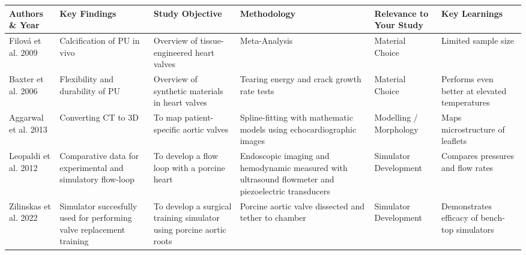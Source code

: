 \renewcommand{\arraystretch}{1.2}
\begin{tabular}{p{50pt}|p{75pt}|p{75pt}|p{110pt}|p{55pt}|p{75pt}}
  \textbf{Authors \& Year} & \textbf{Key Findings}                                                & \textbf{Study Objective}                                            & \textbf{Methodology}                                                                                & \textbf{Relevance to Your Study} & \textbf{Key Learnings}                        \\ \hline
  Filová et al. 2009       & Calcification of PU in vivo                                          & Overview of tissue-engineered heart valves                          & Meta-Analysis                                                                                       & Material Choice                  & Limited sample size                           \\
  Baxter et al. 2006       & Flexibility and durability of PU                                     & Overview of synthetic materials in heart valves                     & Tearing energy and crack growth rate tests                                                          & Material Choice                  & Performs even better at elevated temperatures \\
  Aggarwal et al. 2013     & Converting CT to 3D                                                  & To map patient-specific aortic valves                               & Spline-fitting with mathematic models using echocardiographic images                                & Modelling / Morphology           & Maps microstructure of leaflets               \\
  Leopaldi et al. 2012     & Comparative data for experimental and simulatory flow-loop           & To develop a flow loop with a porcine heart                         & Endoscopic imaging and hemodynamic measured with ultrasound flowmeter and piezoelectric transducers & Simulator Development            & Compares pressures and flow rates             \\
  Zilinskas et al. 2022    & Simulator succesfully used for performing valve replacement training & To develop a surgical training simulator using porcine aortic roots & Porcine aortic valve dissected and tether to chamber                                                & Simulator Development            & Demonstrates efficacy of bench-top simulators \\
\end{tabular}

